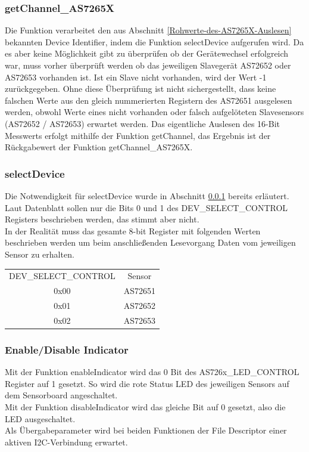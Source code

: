 \subsubsection{getChannel\_AS7265X}\label{getChannel_AS7265X}
Die Funktion verarbeitet den aus Abschnitt \ref{Rohwerte-des-AS7265X-Auslesen} bekannten Device Identifier, indem die Funktion selectDevice aufgerufen wird.
	Da es aber keine Möglichkeit gibt zu überprüfen ob der Gerätewechsel erfolgreich war, muss vorher überprüft werden ob das jeweiligen Slavegerät AS72652 oder AS72653 vorhanden ist.
	Ist ein Slave nicht vorhanden, wird der Wert -1 zurückgegeben.
	Ohne diese Überprüfung ist nicht sichergestellt, dass keine falschen Werte aus den gleich nummerierten Registern des AS72651 ausgelesen werden, obwohl Werte eines nicht vorhanden oder falsch aufgelöteten Slavesensors (AS72652 / AS72653) erwartet werden.
	Das eigentliche Auslesen des 16-Bit Messwerts erfolgt mithilfe der Funktion getChannel, das Ergebnis ist der Rückgabewert der Funktion getChannel\_AS7265X.\\



\subsubsection{selectDevice}
Die Notwendigkeit für selectDevice wurde in Abschnitt \ref{getChannel_AS7265X} bereits erläutert.
Laut Datenblatt sollen nur die Bits 0 und 1 des DEV\_SELECT\_CONTROL Registers beschrieben werden, das stimmt aber nicht.\\
In der Realität muss das gesamte 8-bit Register mit folgenden Werten beschrieben werden um beim anschließenden Lesevorgang Daten vom jeweiligen Sensor zu erhalten.
\begin{center}
\begin{tabular}{ c c }
 	DEV\_SELECT\_CONTROL & Sensor \\ 
 	0x00 & AS72651 \\  
 	0x01 & AS72652 \\
 	0x02 & AS72653 \\  
\end{tabular}
\end{center}



\subsubsection{Enable/Disable Indicator}
Mit der Funktion enableIndicator wird das 0 Bit des AS726x\_LED\_CONTROL Register auf 1 gesetzt. So wird die rote Status LED des jeweiligen Sensors auf dem Sensorboard angeschaltet.\\
Mit der Funktion disableIndicator wird das gleiche Bit auf 0 gesetzt, also die LED ausgeschaltet.\\
Als Übergabeparameter wird bei beiden Funktionen der File Descriptor einer aktiven I2C-Verbindung erwartet.\\

